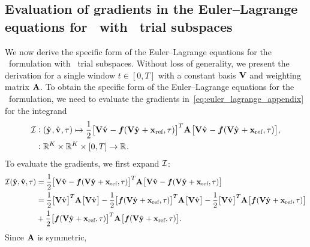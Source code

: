 \documentclass[3p,computermodern,10pt]{elsarticle}
\begin{document}
\begin{appendices}
\section{Evaluation of gradients in the Euler--Lagrange equations for \methodAcronym\ with \spatialAcronym\ trial subspaces}\label{appendix:vector_calc}
We now derive the specific form of the Euler--Lagrange equations for the \methodAcronym\ formulation with \spatialAcronym\ trial subspaces. Without loss of generality, we present the derivation for a single window $t \in [0,T]$ with a constant basis $\mathbf {V}$ and weighting matrix $\mathbf{A}$.  
To obtain the specific form of the Euler--Lagrange equations for the \methodAcronym\ formulation, we need to evaluate the gradients in~\eqref{eq:euler_lagrange_appendix} for the integrand
\begin{align*}\label{eq:integrand_apx}
 \mathcal{I} & \vcentcolon
(\hat{\mathbf{y}}^{}, \hat{\mathbf{v}}^{} ,\tau) \mapsto \frac{1}{2} \big[
\mathbf {V} \hat{\mathbf{v}}^{} - \boldsymbol f(\mathbf {V} \hat{\mathbf{y}}^{}
+ \mathbf{x}_\text{ref},\tau) \big]^T \mathbf{A}^{} \big[
\mathbf {V} \hat{\mathbf{v}}^{}  - \boldsymbol f(\mathbf {V} \hat{\mathbf{y}}^{} +
\mathbf{x}_\text{ref},\tau) \big], \\ & 
\vcentcolon \mathbb{R}^{K} \times \mathbb{R}^{K} \times [0,T]
 \rightarrow \mathbb{R}^{} .  
\end{align*}
To evaluate the gradients, we first expand $\mathcal{I}$:
\begin{align*}
 \mathcal{I}(\hat{\mathbf{y}},\hat{\mathbf{v}},\tau)  &= \frac{1}{2} \big[ \mathbf {V} \hat{\mathbf{v}}^{}  - \boldsymbol f(\mathbf {V} \hat{\mathbf{y}}^{} + \mathbf{x}_\text{ref},\tau) \big]^T \mathbf{A}^{} \big[ \mathbf {V} \hat{\mathbf{v}}^{} - \boldsymbol f(\mathbf {V} \hat{\mathbf{y}}^{} + \mathbf{x}_\text{ref},\tau) \big] \\ 
 &= \frac{1}{2}\big[\mathbf {V} \hat{\mathbf{v}}^{}  \big]^T  \mathbf{A}^{}  \big[\mathbf {V} \hat{\mathbf{v}}^{} \big]  - \frac{1}{2}\big[ \boldsymbol f(\mathbf {V} \hat{\mathbf{y}}^{} + \mathbf{x}_\text{ref},\tau) \big]^T \mathbf{A}^{}  \big[\mathbf {V} \hat{\mathbf{v}}^{}\big] - \frac{1}{2} \big[ \mathbf {V} \hat{\mathbf{v}}^{} \big]^T \mathbf{A}^{} \big[ \boldsymbol f(\mathbf {V} \hat{\mathbf{y}}^{} + \mathbf{x}_\text{ref},\tau) \big]  \\ &+ \frac{1}{2}\big[\boldsymbol f(\mathbf {V} \hat{\mathbf{y}}^{} + \mathbf{x}_\text{ref},\tau) \big]^T \mathbf{A}^{} \big[ \boldsymbol f(\mathbf {V} \hat{\mathbf{y}}^{} + \mathbf{x}_\text{ref},\tau) \big].
\end{align*}
Since $\mathbf{A}$ is symmetric,

\end{appendices}
\end{document}
